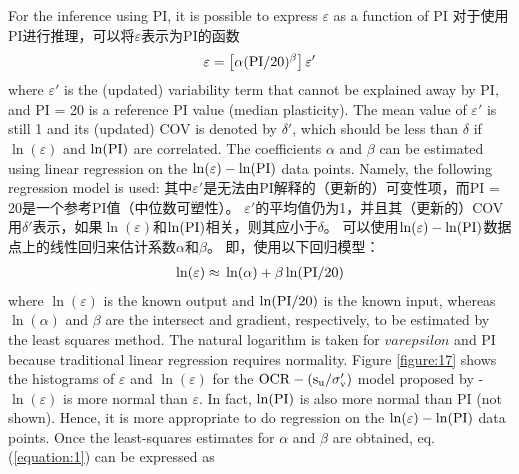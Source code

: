 
\begin{Parallel}{0.60\textwidth}{}
    \ParallelLText
    {
        For the inference using PI, it is possible to express $\varepsilon$ as a function of PI
    }
    \ParallelRText
    {
        对于使用PI进行推理，可以将$\varepsilon$表示为PI的函数
    }
    \ParallelPar
    \begin{align}
        \varepsilon=\left[\alpha(\rm{PI}/20)^\beta\right]\varepsilon'
        \label{equation:4}
    \end{align}
    \ParallelLText
    {
        where $\varepsilon'$ is the (updated) variability term that cannot be explained away by PI, and PI = 20 is a reference PI value (median plasticity). The mean value of $\varepsilon'$ is still 1 and its (updated) COV is denoted by $\delta'$, which should be less than $\delta$ if $\ln(\varepsilon)$ and $\ln(\rm{PI})$ are correlated. The coefficients $\alpha$ and $\beta$ can be estimated using linear regression on the $\ln(\varepsilon)-\ln(\rm{PI})$ data points. Namely, the following regression model is used:
    }
    \ParallelRText
    {
        其中$\varepsilon'$是无法由PI解释的（更新的）可变性项，而PI = 20是一个参考PI值（中位数可塑性）。 $\varepsilon'$的平均值仍为1，并且其（更新的）COV用$\delta'$表示，如果$\ln(\varepsilon)$和$\ln(\rm{PI})$相关，则其应小于$\delta$。 可以使用$\ln(\varepsilon)-\ln(\rm{PI})$数据点上的线性回归来估计系数$\alpha$和$\beta$。 即，使用以下回归模型：
    }
    \ParallelPar
    \begin{align}
        \ln(\varepsilon)\approx{}\ln(\alpha)+\beta\ln(\rm{PI}/20)
        \label{equation:5}
    \end{align}
    \ParallelLText
    {
        where $\ln(\varepsilon)$ is the known output and $\ln(\rm{PI}/20)$ is the known input, whereas $\ln(\alpha)$ and $\beta$ are the intersect and gradient, respectively, to be estimated by the least squares method. The natural logarithm is taken for $varepsilon$ and PI because traditional linear regression requires normality. Figure \ref{figure:17} shows the histograms of $\varepsilon$ and $\ln(\varepsilon)$ for the $\rm{OCR}-(s_u/\sigma_v')$ model proposed by \citet{Jamiolkowski198557} - $\ln(\varepsilon)$ is more normal than $\varepsilon$. In fact, $\ln(\rm{PI})$ is also more normal than PI (not shown). Hence, it is more appropriate to do regression on the $\ln(\varepsilon)-\ln(\rm{PI})$ data points. Once the least-squares estimates for $\alpha$ and $\beta$ are obtained, eq. (\ref{equation:1}) can be expressed as
}
\end{Parallel}
